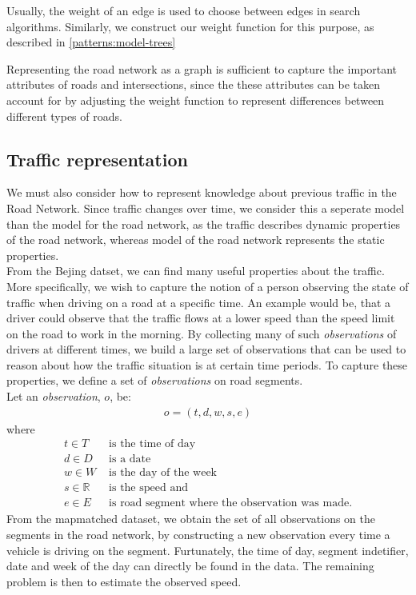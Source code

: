 Usually, the weight of an edge is used to choose between edges in search algorithms. Similarly, we construct our weight function for this purpose, as described in \ref{patterns:model-trees} \par
Representing the road network as a graph is sufficient to capture the important attributes of roads and intersections, since the these attributes can be taken account for by adjusting the weight function to represent differences between different types of roads.

\subsection{Traffic representation}\label{KR:traffic}
We must also consider how to represent knowledge about previous traffic in the Road Network. Since traffic changes over time, we consider this a seperate model than the model for the road network, as the traffic describes dynamic properties of the road network, whereas model of the road network represents the static properties.\\
From the Bejing datset, we can find many useful properties about the traffic. More specifically, we wish to capture the notion of a person observing the state of traffic when driving on a road at a specific time. An example would be, that a driver could observe that the traffic flows at a lower speed than the speed limit on the road to work in the morning. By collecting many of such \emph{observations} of drivers at different times, we build a large set of observations that can be used to reason about how the traffic situation is at certain time periods. To capture these properties, we define a set of \emph{observations} on road segments.\\
Let an \emph{observation}, $o$, be:
\begin{align*}
o = (t, d, w, s, e)
\end{align*}
where
\begin{align*}
t \in T &\text{ is the time of day} \\
d \in D &\text{ is a date} \\
w \in W &\text{ is the day of the week} \\
s \in \mathbb{R} &\text{ is the speed and}\\
e \in E &\text{ is road segment where the observation was made.}
\end{align*}
From the mapmatched dataset, we obtain the set of all observations on the segments in the road network, by constructing a new observation every time a vehicle is driving on the segment. Furtunately, the time of day, segment indetifier, date and week of the day can directly be found in the data. The remaining problem is then to estimate the observed speed.

